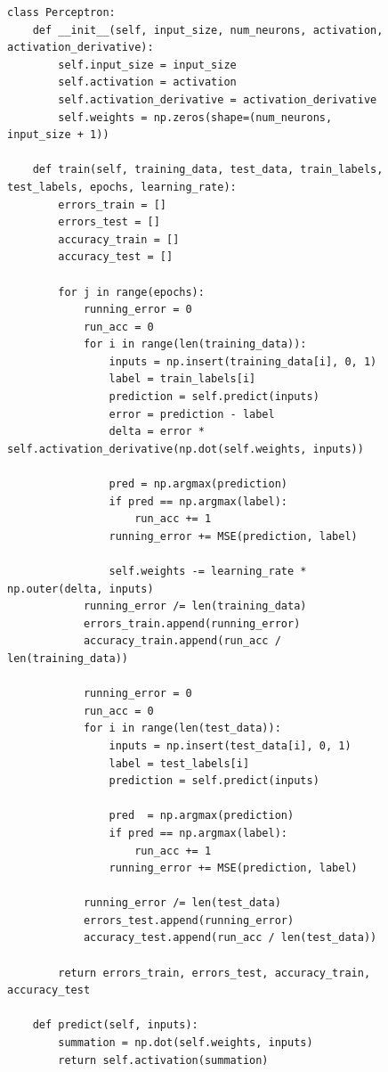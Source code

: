 \documentclass[a4paper, 14pt]{extarticle}
\begin{document}
\begin{figure}[H]
\begin{lstlisting}[language={},caption={Реализация перцептрона},label={lst:code2}]
class Perceptron:
    def __init__(self, input_size, num_neurons, activation, activation_derivative):
        self.input_size = input_size
        self.activation = activation
        self.activation_derivative = activation_derivative
        self.weights = np.zeros(shape=(num_neurons, input_size + 1))

    def train(self, training_data, test_data, train_labels, test_labels, epochs, learning_rate):
        errors_train = []
        errors_test = []
        accuracy_train = []
        accuracy_test = []

        for j in range(epochs):
            running_error = 0
            run_acc = 0
            for i in range(len(training_data)):
                inputs = np.insert(training_data[i], 0, 1)
                label = train_labels[i]
                prediction = self.predict(inputs)
                error = prediction - label
                delta = error * self.activation_derivative(np.dot(self.weights, inputs))

                pred = np.argmax(prediction)
                if pred == np.argmax(label):
                    run_acc += 1
                running_error += MSE(prediction, label)

                self.weights -= learning_rate * np.outer(delta, inputs)
            running_error /= len(training_data)
            errors_train.append(running_error)
            accuracy_train.append(run_acc / len(training_data))

            running_error = 0
            run_acc = 0
            for i in range(len(test_data)):
                inputs = np.insert(test_data[i], 0, 1)
                label = test_labels[i]
                prediction = self.predict(inputs)

                pred  = np.argmax(prediction)
                if pred == np.argmax(label):
                    run_acc += 1
                running_error += MSE(prediction, label)

            running_error /= len(test_data)
            errors_test.append(running_error)
            accuracy_test.append(run_acc / len(test_data))

        return errors_train, errors_test, accuracy_train, accuracy_test

    def predict(self, inputs):
        summation = np.dot(self.weights, inputs)
        return self.activation(summation)
\end{lstlisting}
\end{figure}
\end{document}
